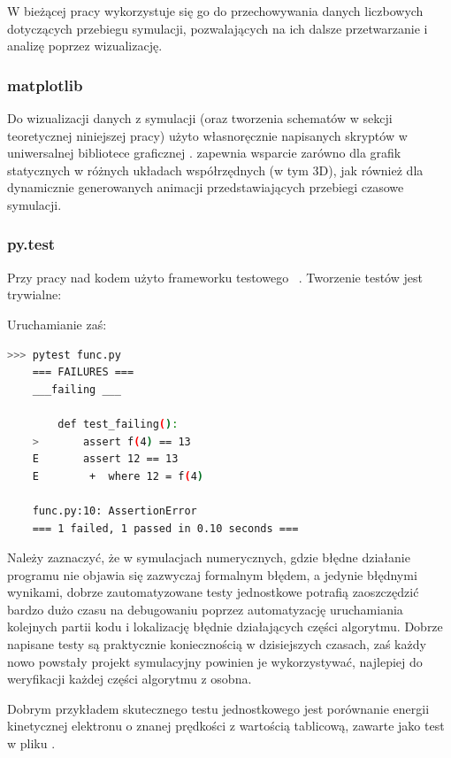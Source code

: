 W bieżącej pracy wykorzystuje się go do przechowywania danych liczbowych
dotyczących przebiegu symulacji, pozwalających na ich dalsze przetwarzanie
i analizę poprzez wizualizację.

\subsubsection{matplotlib}
Do wizualizacji danych z symulacji (oraz tworzenia schematów w sekcji
teoretycznej niniejszej pracy) użyto własnoręcznie napisanych skryptów w
uniwersalnej bibliotece graficznej \cite{matplotlib}.
 zapewnia wsparcie zarówno dla grafik statycznych w różnych układach
współrzędnych (w tym 3D), jak również dla dynamicznie generowanych animacji
przedstawiających przebiegi czasowe symulacji.

\subsubsection{py.test}
Przy pracy nad kodem użyto frameworku testowego ~\cite{pytest}.
Tworzenie testów jest trywialne:



Uruchamianie zaś:

\begin{lstlisting}[language=Bash]
    >>> pytest func.py
    === FAILURES ===
    ___failing ___

        def test_failing():
    >       assert f(4) == 13
    E       assert 12 == 13
    E        +  where 12 = f(4)

    func.py:10: AssertionError
    === 1 failed, 1 passed in 0.10 seconds ===
\end{lstlisting}

Należy zaznaczyć, że w symulacjach numerycznych, gdzie błędne działanie programu nie
objawia się zazwyczaj formalnym błędem, a jedynie błędnymi
wynikami, dobrze zautomatyzowane testy jednostkowe potrafią zaoszczędzić
bardzo dużo czasu na debugowaniu poprzez automatyzację uruchamiania
kolejnych partii kodu i lokalizację błędnie działających części algorytmu.
Dobrze napisane testy są praktycznie koniecznością w dzisiejszych czasach,
zaś każdy nowo powstały projekt symulacyjny powinien je
wykorzystywać, najlepiej do weryfikacji każdej części algorytmu z osobna.

Dobrym przykładem skutecznego testu jednostkowego jest porównanie energii kinetycznej
elektronu o znanej prędkości z wartością tablicową, zawarte jako test w pliku
.

